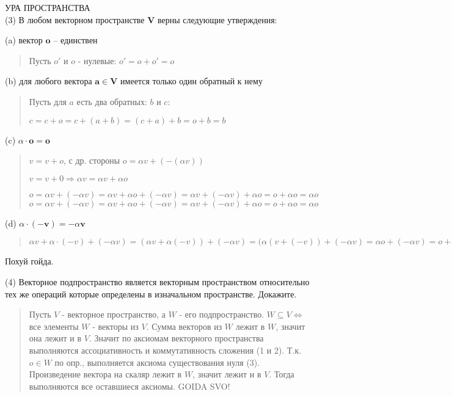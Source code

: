 \documentclass{article}
\begin{document}
УРА ПРОСТРАНСТВА \\

(3) В любом векторном пространстве $\mathbf{V}$ верны следующие утверждения:

(a) вектор $\mathbf{o}$ – единствен 
\begin{quote}
Пусть $o'$ и $o$ - нулевые:
    $o' = o + o' = o$
\end{quote}

(b) для любого вектора $\mathbf{a} \in \mathbf{V}$ имеется только один обратный к нему
\begin{quote}
   Пусть для $a$ есть два обратных: $b$ и $c$: 

   $
   c = c + o = c + (a + b) = (c + a) + b = o + b = b
   $
\end{quote}
(c) $\alpha \cdot \mathbf{o} = \mathbf{o}$
\begin{quote}
    $v = v + o$, с др. стороны $o = \alpha v + (-(\alpha v))$

    $v = v + 0 \Rightarrow \alpha v = \alpha v + \alpha o$

    $o = \alpha v + (- \alpha v) = \alpha v + \alpha o + (-\alpha v) = \alpha v + (- \alpha v) + \alpha o = o + \alpha o = \alpha o$
    $o = \alpha v + (- \alpha v) = \alpha v + \alpha o + (-\alpha v) = \alpha v + (- \alpha v) + \alpha o = o + \alpha o = \alpha o$
\end{quote}

(d) $\alpha \cdot (-\mathbf{v}) = - \alpha \mathbf{v}$
\begin{quote}
    $\alpha v + \alpha \cdot (-v) + (- \alpha v) = (\alpha v + \alpha (-v)) + (- \alpha v) =
    (\alpha(v + (-v)) + (-\alpha v) = \alpha o + (- \alpha v) = o + (-\alpha v) = -\alpha v$
\end{quote}
Похуй гойда.

(4) Векторное подпространство является векторным пространством относительно тех же операций которые определены в изначальном пространстве. Докажите. 
\begin{quote}
    Пусть $V$ - векторное пространство, а $W$ - его подпространство. $W \subseteq V \Longleftrightarrow$ все элементы $W$ - векторы из $V$. Сумма векторов из $W$ лежит в $W$, значит она лежит и в $V$. Значит по аксиомам векторного пространства выполняются ассоциативность и коммутативность сложения (1 и 2). Т.к. $o \in W$ по опр., выполняется аксиома существования нуля (3). Произведение вектора на скаляр лежит в $W$, значит лежит и в $V$. Тогда выполняются все оставшиеся аксиомы. GOIDA SVO!
\end{quote}
\end{document}
